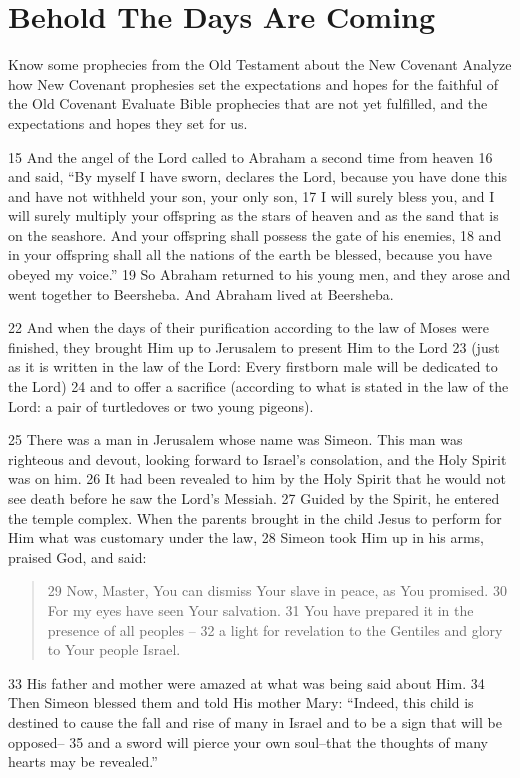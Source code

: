 \chapter{Behold The Days Are Coming}
\begin{goals}
\goal Know some prophecies from the Old Testament about the New Covenant
\goal Analyze how New Covenant prophesies set the expectations and hopes for the faithful of the Old Covenant
\goal Evaluate Bible prophecies that are not yet fulfilled, and the expectations and hopes they set for us.
\end{goals}
\begin{bible}


15 And the angel of the Lord called to Abraham a second time from heaven 16 and said, ``By myself I have sworn, declares the Lord, because you have done this and have not withheld your son, your only son, 17 I will surely bless you, and I will surely multiply your offspring as the stars of heaven and as the sand that is on the seashore. And your offspring shall possess the gate of his enemies, 18 and in your offspring shall all the nations of the earth be blessed, because you have obeyed my voice.'' 19 So Abraham returned to his young men, and they arose and went together to Beersheba. And Abraham lived at Beersheba.

22 And when the days of their purification according to the law of Moses were finished, they brought Him up to Jerusalem to present Him to the Lord 23 (just as it is written in the law of the Lord: Every firstborn male will be dedicated to the Lord) 24 and to offer a sacrifice (according to what is stated in the law of the Lord: a pair of turtledoves or two young pigeons).

25 There was a man in Jerusalem whose name was Simeon. This man was righteous and devout, looking forward to Israel's consolation, and the Holy Spirit was on him. 26 It had been revealed to him by the Holy Spirit that he would not see death before he saw the Lord's Messiah. 27 Guided by the Spirit, he entered the temple complex. When the parents brought in the child Jesus to perform for Him what was customary under the law, 28 Simeon took Him up in his arms, praised God, and said:
\begin{quote}
29 Now, Master, You can dismiss Your slave in peace, as You promised.
30 For my eyes have seen Your salvation.
31 You have prepared it in the presence of all peoples --
32 a light for revelation to the Gentiles and glory to Your people Israel.
\end{quote}
33 His father and mother were amazed at what was being said about Him. 34 Then Simeon blessed them and told His mother Mary: ``Indeed, this child is destined to cause the fall and rise of many in Israel and to be a sign that will be opposed-- 35 and a sword will pierce your own soul--that the thoughts of many hearts may be revealed.''


\end{bible}
